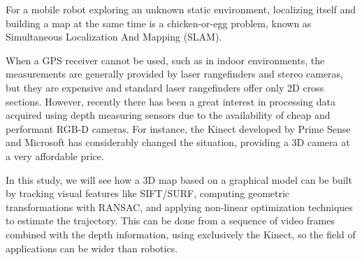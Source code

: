 For a mobile robot exploring an unknown static environment, localizing itself and building a map at the same time is a chicken-or-egg problem, known as Simultaneous Localization And Mapping (SLAM).

When a GPS receiver cannot be used, such as in indoor environments, the measurements are generally provided by laser rangefinders and stereo cameras, but they are expensive and standard laser rangefinders offer only 2D cross sections. However, recently there has been a great interest in processing data acquired using depth measuring sensors due to the availability of cheap and performant RGB-D cameras. For instance, the Kinect developed by Prime Sense and Microsoft has considerably changed the situation, providing a 3D camera at a very affordable price.

In this study, we will see how a 3D map based on a graphical model can be built by tracking visual features like SIFT/SURF, computing geometric transformations with RANSAC, and applying non-linear optimization techniques to estimate the trajectory. This can be done from a sequence of video frames combined with the depth information, using exclusively the Kinect, so the field of applications can be wider than robotics.